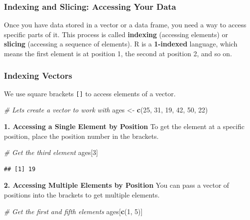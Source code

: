 \documentclass[
  11pt,
]{article}
\newenvironment{Shaded}{\begin{snugshade}}{\end{snugshade}}
\newcommand{\CommentTok}[1]{\textcolor[rgb]{0.56,0.35,0.01}{\textit{#1}}}
\newcommand{\DecValTok}[1]{\textcolor[rgb]{0.00,0.00,0.81}{#1}}
\newcommand{\FunctionTok}[1]{\textcolor[rgb]{0.13,0.29,0.53}{\textbf{#1}}}
\newcommand{\NormalTok}[1]{#1}
\newcommand{\OtherTok}[1]{\textcolor[rgb]{0.56,0.35,0.01}{#1}}
\begin{document}
\subsubsection{Indexing and Slicing: Accessing Your
Data}\label{indexing-and-slicing-accessing-your-data}

Once you have data stored in a vector or a data frame, you need a way to
access specific parts of it. This process is called \textbf{indexing}
(accessing elements) or \textbf{slicing} (accessing a sequence of
elements). R is a \textbf{1-indexed} language, which means the first
element is at position 1, the second at position 2, and so on.

\subsubsection{Indexing Vectors}\label{indexing-vectors}

We use square brackets \texttt{{[}{]}} to access elements of a vector.

\begin{Shaded}
\begin{Highlighting}[]
\CommentTok{\# Let\textquotesingle{}s create a vector to work with}
\NormalTok{ages }\OtherTok{\textless{}{-}} \FunctionTok{c}\NormalTok{(}\DecValTok{25}\NormalTok{, }\DecValTok{31}\NormalTok{, }\DecValTok{19}\NormalTok{, }\DecValTok{42}\NormalTok{, }\DecValTok{50}\NormalTok{, }\DecValTok{22}\NormalTok{)}
\end{Highlighting}
\end{Shaded}

\textbf{1. Accessing a Single Element by Position} To get the element at
a specific position, place the position number in the brackets.

\begin{Shaded}
\begin{Highlighting}[]
\CommentTok{\# Get the third element}
\NormalTok{ages[}\DecValTok{3}\NormalTok{]}
\end{Highlighting}
\end{Shaded}

\begin{verbatim}
## [1] 19
\end{verbatim}

\textbf{2. Accessing Multiple Elements by Position} You can pass a
vector of positions into the brackets to get multiple elements.

\begin{Shaded}
\begin{Highlighting}[]
\CommentTok{\# Get the first and fifth elements}
\NormalTok{ages[}\FunctionTok{c}\NormalTok{(}\DecValTok{1}\NormalTok{, }\DecValTok{5}\NormalTok{)]}
\end{Highlighting}
\end{Shaded}
\end{document}
